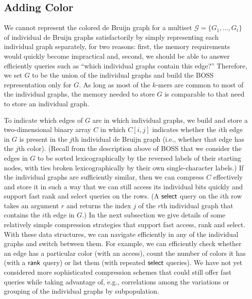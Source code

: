 \subsection{Adding Color}
\label{subsec:color}

We cannot represent the colored de Bruijn graph for a multiset \(\mathcal{G} = \{G_1, \ldots, G_t\}\) of individual de Bruijn graphs satisfactorily by simply representing each individual graph separately, for two reasons: first, the memory requirements would quickly become impractical and, second, we should be able to answer efficiently queries such as ``which individual graphs contain this edge?''  Therefore, we set $G$ to be the union of the individual graphs and build the BOSS representation only for $G$.  As long as most of the $k$-mers are common to most of the individual graphs, the memory needed to store $G$ is comparable to that need to store an individual graph.

To indicate which edges of $G$ are in which individual graphs, we build and store a two-dimensional binary array $C$ in which \(C [i, j]\) indicates whether the $i$th edge in $G$ is present in the $j$th individual de Bruijn graph (i.e., whether that edge has the $j$th color). 
(Recall from the description above of BOSS that we consider the edges in $G$ to be sorted lexicographically by the reversed labels of their starting nodes, with ties broken lexicographically by their own single-character labels.) 
If the individual graphs are sufficiently similar, then we can compress $C$ effectively and store it in such a way that we can still access its individual bits quickly and support fast rank and select queries on the rows.  (A $\mathsf{select}$ query on the $i$th row takes an argument $r$ and returns the index $j$ of the $r$th individual graph that contains the $i$th edge in $G$.)  In the next subsection we give details of some relatively simple compression strategies that support fast access, rank and select.  With these data structures, we can navigate efficiently in any of the individual graphs and switch between them.  For example, we can efficiently check whether an edge has a particular color (with an access), count the number of colors it has (with a $\mathsf{rank}$ query) or list them (with repeated $\mathsf{select}$ queries).  We have not yet considered more sophisticated compression schemes that could still offer fast queries while taking advantage of, e.g., correlations among the variations or grouping of the individual graphs by subpopulation.

